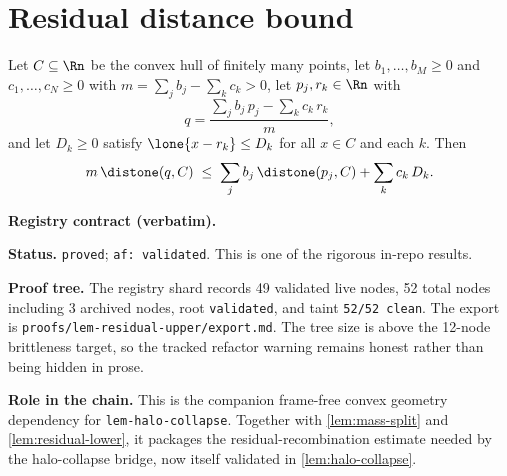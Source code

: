 \section{Residual distance bound}\label{sec:residual-upper}

\begin{lemma}\label{lem:residual-upper}
Let $C\subseteq\Rn$ be the convex hull of finitely many points, let
$b_1,\dots,b_M\ge0$ and $c_1,\dots,c_N\ge0$ with $m=\sum_j b_j-\sum_k c_k>0$,
let $p_j,r_k\in\Rn$ with
\[
  q=\frac{\sum_j b_j\,p_j-\sum_k c_k\,r_k}{m},
\]
and let $D_k\ge0$ satisfy $\lone{x-r_k}\le D_k$ for all $x\in C$ and each $k$.
Then
\[
  m\,\distone(q,C)\;\le\;\sum_j b_j\,\distone(p_j,C)+\sum_k c_k\,D_k.
\]
\end{lemma}

\noindent\textbf{Registry contract (verbatim).}

\noindent\textbf{Status.} \texttt{proved}; \texttt{af: validated}.
This is one of the rigorous in-repo results.

\noindent\textbf{Proof tree.} The registry shard records 49 validated
live nodes, 52 total nodes including 3 archived nodes, root
\texttt{validated}, and taint \texttt{52/52 clean}.  The export is
\texttt{proofs/lem-residual-upper/export.md}.  The tree size is above
the 12-node brittleness target, so the tracked refactor warning remains
honest rather than being hidden in prose.

\noindent\textbf{Role in the chain.} This is the companion frame-free
convex geometry dependency for \texttt{lem-halo-collapse}.  Together
with \ref{lem:mass-split} and \ref{lem:residual-lower}, it packages the
residual-recombination estimate needed by the halo-collapse bridge,
now itself validated in \ref{lem:halo-collapse}.
